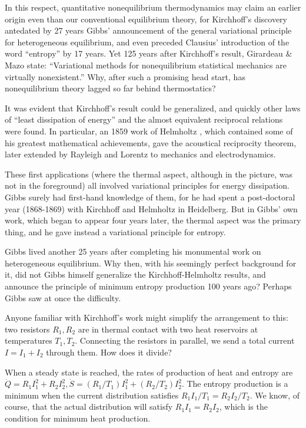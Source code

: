 \documentclass{article}
\begin{document}
In this respect, quantitative nonequilibrium thermodynamics may claim an earlier origin even than our conventional equilibrium theory, for Kirchhoff's discovery antedated by 27 years Gibbs' announcement \cite{gibbs1876} of the general variational principle for heterogeneous equilibrium, and even preceded Clausius' introduction \cite{clausius1865} of the word ``entropy'' by 17 years. Yet 125 years after Kirchhoff's result, Girardeau \& Mazo \cite{girardeau1973} state: ``Variational methods for nonequilibrium statistical mechanics are virtually nonexistent.'' Why, after such a promising head start, has nonequilibrium theory lagged so far behind thermostatics?

It was evident that Kirchhoff's result could be generalized, and quickly other laws of ``least dissipation of energy'' and the almost equivalent reciprocal relations were found. In particular, an 1859 work of Helmholtz \cite{helmholtz1859}, which contained some of his greatest mathematical achievements, gave the acoustical reciprocity theorem, later extended by Rayleigh \cite{rayleigh1877} and Lorentz \cite{lorentz1895} to mechanics and electrodynamics.

These first applications (where the thermal aspect, although in the picture, was not in the foreground) all involved variational principles for energy dissipation. Gibbs surely had first-hand knowledge of them, for he had spent a post-doctoral year (1868-1869) with Kirchhoff and Helmholtz in Heidelberg. But in Gibbs' own work, which began to appear four years later, the thermal aspect was the primary thing, and he gave instead a variational principle for entropy.

Gibbs lived another 25 years after completing his monumental work on heterogeneous equilibrium. Why then, with his seemingly perfect background for it, did not Gibbs himself generalize the Kirchhoff-Helmholtz results, and announce the principle of minimum entropy production 100 years ago? Perhaps Gibbs saw at once the difficulty.

Anyone familiar with Kirchhoff's work might simplify the arrangement to this: two resistors $R_1, R_2$ are in thermal contact with two heat reservoirs at temperatures $T_1, T_2$. Connecting the resistors in parallel, we send a total current $I=I_1+I_2$ through them. How does it divide?

When a steady state is reached, the rates of production of heat and entropy are $\dot{Q}=R_1 I_1^2+R_2 I_2^2, \dot{S}=\left(R_1 / T_1\right) I_1^2+\left(R_2 / T_2\right) I_2^2$. The entropy production is a minimum when the current distribution satisfies $R_1 I_1 / T_1=R_2 I_2 / T_2$. We know, of course, that the actual distribution will satisfy $R_1 I_1=R_2 I_2$, which is the condition for minimum heat production.
\end{document}
